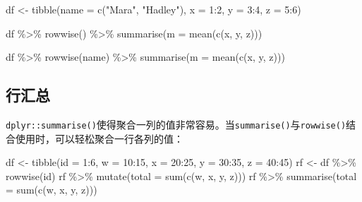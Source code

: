 \documentclass[
]{book}
\newenvironment{Shaded}{\begin{snugshade}}{\end{snugshade}}
\newcommand{\AttributeTok}[1]{\textcolor[rgb]{0.77,0.63,0.00}{#1}}
\newcommand{\DecValTok}[1]{\textcolor[rgb]{0.00,0.00,0.81}{#1}}
\newcommand{\FunctionTok}[1]{\textcolor[rgb]{0.00,0.00,0.00}{#1}}
\newcommand{\NormalTok}[1]{#1}
\newcommand{\OtherTok}[1]{\textcolor[rgb]{0.56,0.35,0.01}{#1}}
\newcommand{\SpecialCharTok}[1]{\textcolor[rgb]{0.00,0.00,0.00}{#1}}
\newcommand{\StringTok}[1]{\textcolor[rgb]{0.31,0.60,0.02}{#1}}
\begin{document}
\begin{Shaded}
\begin{Highlighting}[]
\NormalTok{df }\OtherTok{\textless{}{-}} \FunctionTok{tibble}\NormalTok{(}\AttributeTok{name =} \FunctionTok{c}\NormalTok{(}\StringTok{"Mara"}\NormalTok{, }\StringTok{"Hadley"}\NormalTok{), }\AttributeTok{x =} \DecValTok{1}\SpecialCharTok{:}\DecValTok{2}\NormalTok{, }\AttributeTok{y =} \DecValTok{3}\SpecialCharTok{:}\DecValTok{4}\NormalTok{, }\AttributeTok{z =} \DecValTok{5}\SpecialCharTok{:}\DecValTok{6}\NormalTok{)}

\NormalTok{df }\SpecialCharTok{\%\textgreater{}\%} 
  \FunctionTok{rowwise}\NormalTok{() }\SpecialCharTok{\%\textgreater{}\%} 
  \FunctionTok{summarise}\NormalTok{(}\AttributeTok{m =} \FunctionTok{mean}\NormalTok{(}\FunctionTok{c}\NormalTok{(x, y, z)))}

\NormalTok{df }\SpecialCharTok{\%\textgreater{}\%} 
  \FunctionTok{rowwise}\NormalTok{(name) }\SpecialCharTok{\%\textgreater{}\%} 
  \FunctionTok{summarise}\NormalTok{(}\AttributeTok{m =} \FunctionTok{mean}\NormalTok{(}\FunctionTok{c}\NormalTok{(x, y, z)))}
\end{Highlighting}
\end{Shaded}

\hypertarget{ux884cux6c47ux603b}{%
\subsection{行汇总}\label{ux884cux6c47ux603b}}

\texttt{dplyr::summarise()}使得聚合一列的值非常容易。当\texttt{summarise()}与\texttt{rowwise()}结合使用时，可以轻松聚合一行各列的值：

\begin{Shaded}
\begin{Highlighting}[]
\NormalTok{df }\OtherTok{\textless{}{-}} \FunctionTok{tibble}\NormalTok{(}\AttributeTok{id =} \DecValTok{1}\SpecialCharTok{:}\DecValTok{6}\NormalTok{, }\AttributeTok{w =} \DecValTok{10}\SpecialCharTok{:}\DecValTok{15}\NormalTok{, }\AttributeTok{x =} \DecValTok{20}\SpecialCharTok{:}\DecValTok{25}\NormalTok{, }\AttributeTok{y =} \DecValTok{30}\SpecialCharTok{:}\DecValTok{35}\NormalTok{, }\AttributeTok{z =} \DecValTok{40}\SpecialCharTok{:}\DecValTok{45}\NormalTok{)}
\NormalTok{rf }\OtherTok{\textless{}{-}}\NormalTok{ df }\SpecialCharTok{\%\textgreater{}\%} \FunctionTok{rowwise}\NormalTok{(id)}
\NormalTok{rf }\SpecialCharTok{\%\textgreater{}\%} \FunctionTok{mutate}\NormalTok{(}\AttributeTok{total =} \FunctionTok{sum}\NormalTok{(}\FunctionTok{c}\NormalTok{(w, x, y, z)))}
\NormalTok{rf }\SpecialCharTok{\%\textgreater{}\%} \FunctionTok{summarise}\NormalTok{(}\AttributeTok{total =} \FunctionTok{sum}\NormalTok{(}\FunctionTok{c}\NormalTok{(w, x, y, z)))}
\end{Highlighting}
\end{Shaded}
\end{document}

